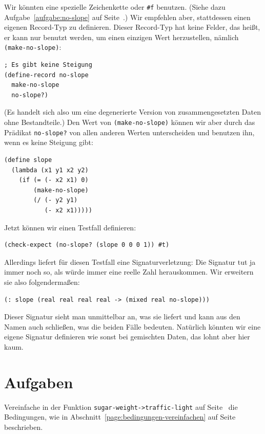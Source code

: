 Wir könnten eine spezielle Zeichenkette oder
\lstinline{#f} benutzen.  (Siehe dazu Aufgabe~\ref{aufgabe:no-slope}
auf Seite~\pageref{aufgabe:no-slope}.)
Wir empfehlen aber, stattdessen einen eigenen Record-Typ zu
definieren.  Dieser Record-Typ hat keine Felder, das heißt, er kann nur benutzt
werden, um einen einzigen Wert herzustellen, nämlich
\lstinline{(make-no-slope)}:
%
\begin{lstlisting}
; Es gibt keine Steigung
(define-record no-slope
  make-no-slope
  no-slope?)
\end{lstlisting}
%
(Es handelt sich also um eine
degenerierte Version von zusammengesetzten Daten ohne Bestandteile.)
Den Wert von \lstinline{(make-no-slope)} können wir aber durch das
Prädikat \lstinline{no-slope?}
von allen anderen Werten unterscheiden und benutzen ihn, wenn es keine
Steigung gibt:
%
\begin{lstlisting}
(define slope
  (lambda (x1 y1 x2 y2)
    (if (= (- x2 x1) 0)
        (make-no-slope)
        (/ (- y2 y1)
           (- x2 x1)))))
\end{lstlisting}
%
Jetzt können wir einen Testfall definieren:
%
\begin{lstlisting}
(check-expect (no-slope? (slope 0 0 0 1)) #t)
\end{lstlisting}
%
Allerdings liefert \drscheme{} für diesen Testfall eine
Signaturverletzung: Die Signatur tut ja immer noch so, als würde immer
eine reelle Zahl herauskommen.  Wir erweitern sie also folgendermaßen:
%
\begin{lstlisting}
(: slope (real real real real -> (mixed real no-slope)))
\end{lstlisting}
%
Dieser Signatur sieht man unmittelbar an, was sie liefert und kann aus
den Namen auch schließen, was die beiden Fälle bedeuten.  Natürlich
könnten wir eine eigene Signatur definieren wie sonst bei gemischten
Daten, das lohnt aber hier kaum.

\section*{Aufgaben}

\begin{aufgabe}
  Vereinfache in der Funktion \lstinline{sugar-weight->traffic-light} auf
  Seite~\pageref{def:sugar-weight-traffic-light} die Bedingungen, wie
  in Abschnitt~\ref{page:bedingungen-vereinfachen} auf
  Seite~\pageref{page:bedingungen-vereinfachen} beschrieben.
\end{aufgabe}

